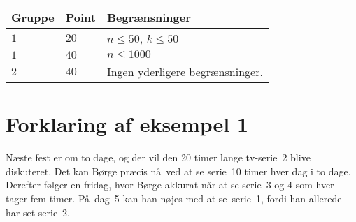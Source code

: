\noindent
\begin{tabular}{| l | l | l |}
\hline
Gruppe & Point & Begrænsninger \\ \hline
$1$   & $20$       & $n \leq 50$, $k \leq 50$ \\ \hline
$1$   & $40$       & $n \leq 1000$ \\ \hline
$2$   & $40$       & Ingen yderligere begrænsninger. \\ \hline
\end{tabular}

\section*{Forklaring af eksempel 1}
Næste fest er om to dage, og der vil den 20 timer lange tv-serie~2 blive diskuteret.
Det kan Børge præcis nå ved at se serie 10 timer hver dag i to dage.
Derefter følger en fridag, hvor Børge akkurat når at se serie~3 og 4 som hver tager fem timer.
På dag~5 kan han nøjes med at se serie~1, fordi han allerede har set serie~2.

